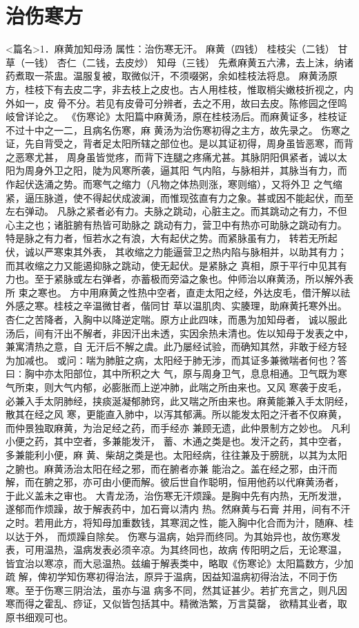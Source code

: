 \documentclass[a4paper,12pt,UTF8,twoside]{ctexbook}
\begin{document}
\chapter{治伤寒方}
<篇名>1．麻黄加知母汤
属性：治伤寒无汗。 
麻黄（四钱） 桂枝尖（二钱） 甘草（一钱） 杏仁（二钱，去皮炒） 知母（三钱） 
先煮麻黄五六沸，去上沫，纳诸药煮取一茶盅。温服复被，取微似汗，不须啜粥，余如桂枝法将息。 
麻黄汤原方，桂枝下有去皮二字，非去枝上之皮也。古人用桂枝，惟取梢尖嫩枝折视之，内外如一，皮 
骨不分。若见有皮骨可分辨者，去之不用，故曰去皮。陈修园之侄鸣岐曾详论之。 
《伤寒论》太阳篇中麻黄汤，原在桂枝汤后。而麻黄证多，桂枝证不过十中之一二，且病名伤寒，麻 
黄汤为治伤寒初得之主方，故先录之。 
伤寒之证，先自背受之，背者足太阳所辖之部位也。是以其证初得，周身虽皆恶寒，而背之恶寒尤甚， 
周身虽皆觉疼，而背下连腿之疼痛尤甚。其脉阴阳俱紧者，诚以太阳为周身外卫之阳，陡为风寒所袭，逼其阳 
气内陷，与脉相并，其脉当有力，而作起伏迭涌之势。而寒气之缩力（凡物之体热则涨，寒则缩），又将外卫 
之气缩紧，逼压脉道，使不得起伏成波澜，而惟现弦直有力之象。甚或因不能起伏，而至左右弹动。 
凡脉之紧者必有力。夫脉之跳动，心脏主之。而其跳动之有力，不但心主之也；诸脏腑有热皆可助脉之 
跳动有力，营卫中有热亦可助脉之跳动有力。特是脉之有力者，恒若水之有浪，大有起伏之势。而紧脉虽有力， 
转若无所起伏，诚以严寒束其外表， 
其收缩之力能逼营卫之热内陷与脉相并，以助其有力；而其收缩之力又能遏抑脉之跳动，使无起伏。是紧脉之 
真相，原于平行中见其有力也。至于紧脉或左右弹者，亦蓄极而旁溢之象也。仲师治以麻黄汤，所以解外表所 
束之寒也。 
方中用麻黄之性热中空者，直走太阳之经，外达皮毛，借汗解以祛外感之寒。桂枝之辛温微甘者，偕同甘 
草以温肌肉、实腠理，助麻黄托寒外出。杏仁之苦降者，入胸中以降逆定喘。原方止此四味，而愚为加知母者， 
诚以服此汤后，间有汗出不解者，非因汗出未透，实因余热未清也。佐以知母于发表之中，兼寓清热之意，自 
无汗后不解之虞。此乃屡经试验，而确知其然，非敢于经方轻为加减也。 
或问∶喘为肺脏之病，太阳经于肺无涉，而其证多兼微喘者何也？答曰∶胸中亦太阳部位，其中所积之大 
气，原与周身卫气，息息相通。卫气既为寒气所束，则大气内郁，必膨胀而上逆冲肺，此喘之所由来也。又风 
寒袭于皮毛，必兼入手太阴肺经，挟痰涎凝郁肺窍，此又喘之所由来也。麻黄能兼入手太阴经，散其在经之风 
寒，更能直入肺中，以泻其郁满。所以能发太阳之汗者不仅麻黄，而仲景独取麻黄，为治足经之药，而手经亦 
兼顾无遗，此仲景制方之妙也。 
凡利小便之药，其中空者，多兼能发汗， 蓄、木通之类是也。发汗之药，其中空者，多兼能利小便，麻 
黄、柴胡之类是也。太阳经病，往往兼及于膀胱，以其为太阳之腑也。麻黄汤治太阳在经之邪，而在腑者亦兼 
能治之。盖在经之邪，由汗而解，而在腑之邪，亦可由小便而解。彼后世自作聪明，恒用他药以代麻黄汤者， 
于此义盖未之审也。 
大青龙汤，治伤寒无汗烦躁。是胸中先有内热，无所发泄，遂郁而作烦躁，故于解表药中，加石膏以清内 
热。然麻黄与石膏 
并用，间有不汗之时。若用此方，将知母加重数钱，其寒润之性，能入胸中化合而为汁，随麻、桂以达于外， 
而烦躁自除矣。 
伤寒与温病，始异而终同。为其始异也，故伤寒发表，可用温热，温病发表必须辛凉。为其终同也，故病 
传阳明之后，无论寒温，皆宜治以寒凉，而大忌温热。兹编于解表类中，略取《伤寒论》太阳篇数方，少加疏 
解，俾初学知伤寒初得治法，原异于温病，因益知温病初得治法，不同于伤寒。至于伤寒三阴治法，虽亦与温 
病多不同，然其证甚少。若扩充言之，则凡因寒而得之霍乱、痧证，又似皆包括其中。精微浩繁，万言莫罄， 
欲精其业者，取原书细观可也。 
\end{document}
